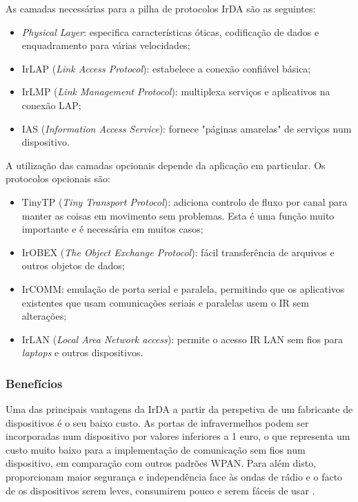 \documentclass[conference]{IEEEtran}
\begin{document}
As camadas necessárias para a pilha de protocolos IrDA são as seguintes:

\begin{itemize}

 \item \textit{Physical Layer}: especifica características óticas, codificação de dados e enquadramento para várias velocidades;
 \item IrLAP (\textit{Link Access Protocol}): estabelece a conexão confiável básica;
 \item IrLMP (\textit{Link Management Protocol}): multiplexa serviços e aplicativos na conexão LAP;
 \item IAS (\textit{Information Access Service}): fornece "páginas amarelas" de serviços num dispositivo.

\end{itemize}

A utilização das camadas opcionais depende da aplicação em particular. Os protocolos opcionais são:

\begin{itemize}

 \item TinyTP (\textit{Tiny Transport Protocol}): adiciona controlo de fluxo por canal para manter as coisas em movimento sem problemas. Esta é uma função muito importante e é necessária em muitos casos;
 \item IrOBEX (\textit{The Object Exchange Protocol}): fácil transferência de arquivos e outros objetos de dados;
 \item IrCOMM: emulação de porta serial e paralela, permitindo que os aplicativos existentes que usam comunicações seriais e paralelas usem o IR sem alterações;
 \item IrLAN (\textit{Local Area Network access}): permite o acesso IR LAN sem fios para \textit{laptops} e outros dispositivos.

\end{itemize}



\subsubsection{Benefícios}

Uma das principais vantagens da IrDA a partir da perspetiva de um fabricante de dispositivos é o seu baixo custo. 
As portas de infravermelhos podem ser incorporadas num dispositivo por valores inferiores a 1 euro, o que representa um custo muito baixo para a implementação de comunicação sem fios num dispositivo, em comparação com outros padrões WPAN. 
Para além disto, proporcionam maior segurança e independência face às ondas de rádio e o facto de os dispositivos serem leves, consumirem pouco e serem fáceis de usar \cite{infaredadvdis}.
\end{document}
